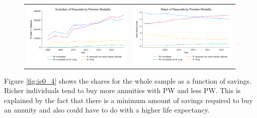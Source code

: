 \documentclass[12pt]{article}
\begin{document}
\begin{figure}[H] \label{fig:ie0_2and3}
\caption{}
\centering{}%
\begin{tabular}{cc}
\includegraphics[scale=0.27]{figures/IE0_plot2.png} & \includegraphics[scale=0.27]{figures/IE0_plot3.png}
\end{tabular}
\end{figure}


Figure \ref{fig:ie0_4} shows the shares for the whole sample as a function of savings. Richer individuals tend to buy more annuities with PW and less PW. This is explained by the fact that there is a minimum amount of savings required to buy an annuity and also could have to do with a higher life expectancy. 
\end{document}
